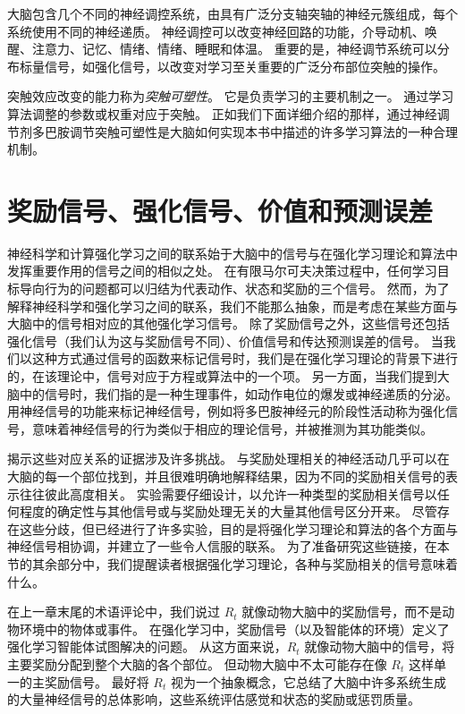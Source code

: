 大脑包含几个不同的神经调控系统，由具有广泛分支轴突轴的神经元簇组成，每个系统使用不同的神经递质。
神经调控可以改变神经回路的功能，介导动机、唤醒、注意力、记忆、情绪、情绪、睡眠和体温。
重要的是，神经调节系统可以分布标量信号，如强化信号，以改变对学习至关重要的广泛分布部位突触的操作。


突触效应改变的能力称为\textit{突触可塑性}。
它是负责学习的主要机制之一。
通过学习算法调整的参数或权重对应于突触。
正如我们下面详细介绍的那样，通过神经调节剂多巴胺调节突触可塑性是大脑如何实现本书中描述的许多学习算法的一种合理机制。


\section{奖励信号、强化信号、价值和预测误差} \label{sec:reward_signals}

神经科学和计算强化学习之间的联系始于大脑中的信号与在强化学习理论和算法中发挥重要作用的信号之间的相似之处。
在有限马尔可夫决策过程中，任何学习目标导向行为的问题都可以归结为代表动作、状态和奖励的三个信号。
然而，为了解释神经科学和强化学习之间的联系，我们不能那么抽象，而是考虑在某些方面与大脑中的信号相对应的其他强化学习信号。
除了奖励信号之外，这些信号还包括强化信号（我们认为这与奖励信号不同）、价值信号和传达预测误差的信号。
当我们以这种方式通过信号的函数来标记信号时，我们是在强化学习理论的背景下进行的，在该理论中，信号对应于方程或算法中的一个项。
另一方面，当我们提到大脑中的信号时，我们指的是一种生理事件，如动作电位的爆发或神经递质的分泌。
用神经信号的功能来标记神经信号，例如将多巴胺神经元的阶段性活动称为强化信号，意味着神经信号的行为类似于相应的理论信号，并被推测为其功能类似。



揭示这些对应关系的证据涉及许多挑战。
与奖励处理相关的神经活动几乎可以在大脑的每一个部位找到，并且很难明确地解释结果，因为不同的奖励相关信号的表示往往彼此高度相关。
实验需要仔细设计，以允许一种类型的奖励相关信号以任何程度的确定性与其他信号或与奖励处理无关的大量其他信号区分开来。
尽管存在这些分歧，但已经进行了许多实验，目的是将强化学习理论和算法的各个方面与神经信号相协调，并建立了一些令人信服的联系。
为了准备研究这些链接，在本节的其余部分中，我们提醒读者根据强化学习理论，各种与奖励相关的信号意味着什么。


在上一章末尾的术语评论中，我们说过 $ R_t $ 就像动物大脑中的奖励信号，而不是动物环境中的物体或事件。
在强化学习中，奖励信号（以及智能体的环境）定义了强化学习智能体试图解决的问题。
从这方面来说，$ R_t $ 就像动物大脑中的信号，将主要奖励分配到整个大脑的各个部位。
但动物大脑中不太可能存在像 $ R_t $ 这样单一的主奖励信号。
最好将 $ R_t $ 视为一个抽象概念，它总结了大脑中许多系统生成的大量神经信号的总体影响，这些系统评估感觉和状态的奖励或惩罚质量。


